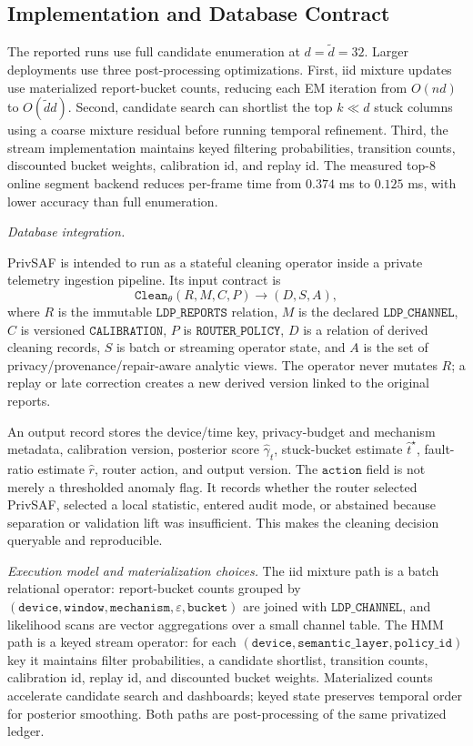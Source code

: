 \documentclass[conference]{IEEEtran}
\begin{document}
\subsection{Implementation and Database Contract}
\label{sec:implementation}

The reported runs use full candidate enumeration at \(d=\tilde d=32\). Larger deployments use three post-processing optimizations. First, iid mixture updates use materialized report-bucket counts, reducing each EM iteration from \(O(nd)\) to \(O(\tilde d d)\). Second, candidate search can shortlist the top \(k\ll d\) stuck columns using a coarse mixture residual before running temporal refinement. Third, the stream implementation maintains keyed filtering probabilities, transition counts, discounted bucket weights, calibration id, and replay id. The measured top-8 online segment backend reduces per-frame time from \(0.374\) ms to \(0.125\) ms, with lower accuracy than full enumeration.

\noindent\emph{Database integration.}
\label{sec:db_integration}

PrivSAF is intended to run as a stateful cleaning operator inside a private telemetry ingestion pipeline. Its input contract is
\[
\texttt{Clean}_{\theta}(R,M,C,P) \rightarrow (D,S,A),
\]
where \(R\) is the immutable \(\texttt{LDP\_REPORTS}\) relation, \(M\) is the declared \(\texttt{LDP\_CHANNEL}\), \(C\) is versioned \(\texttt{CALIBRATION}\), \(P\) is \(\texttt{ROUTER\_POLICY}\), \(D\) is a relation of derived cleaning records, \(S\) is batch or streaming operator state, and \(A\) is the set of privacy/provenance/repair-aware analytic views. The operator never mutates \(R\); a replay or late correction creates a new derived version linked to the original reports.

An output record stores the device/time key, privacy-budget and mechanism metadata, calibration version, posterior score \(\hat\gamma_t\), stuck-bucket estimate \(\hat t^\star\), fault-ratio estimate \(\hat r\), router action, and output version.
The \(\texttt{action}\) field is not merely a thresholded anomaly flag. It records whether the router selected PrivSAF, selected a local statistic, entered audit mode, or abstained because separation or validation lift was insufficient. This makes the cleaning decision queryable and reproducible.

\noindent\emph{Execution model and materialization choices.}
The iid mixture path is a batch relational operator: report-bucket counts grouped by \((\texttt{device},\texttt{window},\texttt{mechanism},\varepsilon,\texttt{bucket})\) are joined with \(\texttt{LDP\_CHANNEL}\), and likelihood scans are vector aggregations over a small channel table. The HMM path is a keyed stream operator: for each \((\texttt{device},\texttt{semantic\_layer},\texttt{policy\_id})\) key it maintains filter probabilities, a candidate shortlist, transition counts, calibration id, replay id, and discounted bucket weights. Materialized counts accelerate candidate search and dashboards; keyed state preserves temporal order for posterior smoothing. Both paths are post-processing of the same privatized ledger.
\end{document}
